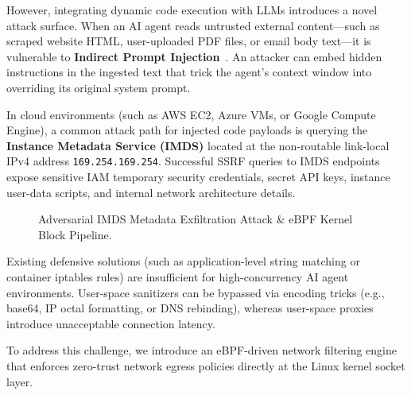 \documentclass[11pt,a4paper]{article}
\begin{document}
However, integrating dynamic code execution with LLMs introduces a novel attack surface. When an AI agent reads untrusted external content—such as scraped website HTML, user-uploaded PDF files, or email body text—it is vulnerable to \textbf{Indirect Prompt Injection}~\cite{prompt_injection}. An attacker can embed hidden instructions in the ingested text that trick the agent's context window into overriding its original system prompt.

In cloud environments (such as AWS EC2, Azure VMs, or Google Compute Engine), a common attack path for injected code payloads is querying the \textbf{Instance Metadata Service (IMDS)} located at the non-routable link-local IPv4 address \texttt{169.254.169.254}. Successful SSRF queries to IMDS endpoints expose sensitive IAM temporary security credentials, secret API keys, instance user-data scripts, and internal network architecture details.

\begin{figure}[h!]
\centering
{}
\caption{Adversarial IMDS Metadata Exfiltration Attack \& eBPF Kernel Block Pipeline.}
\label{fig:imds_attack}
\end{figure}

Existing defensive solutions (such as application-level string matching or container iptables rules) are insufficient for high-concurrency AI agent environments. User-space sanitizers can be bypassed via encoding tricks (e.g., base64, IP octal formatting, or DNS rebinding), whereas user-space proxies introduce unacceptable connection latency.

To address this challenge, we introduce an eBPF-driven network filtering engine that enforces zero-trust network egress policies directly at the Linux kernel socket layer.
\end{document}
